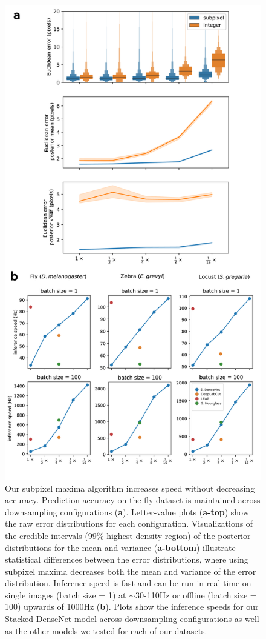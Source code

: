 \documentclass[11pt,a4paper,oneside]{book}
\begin{document}
\begin{appendices}
\begin{figure}[!htb]
    \centering
    \includegraphics[width=0.60\linewidth]{Graving_IMPRS_Thesis/figures/downsample_inference_speed.pdf}
    \caption{Our subpixel maxima algorithm increases speed without decreasing accuracy. Prediction accuracy on the fly dataset is maintained across downsampling configurations (\textbf{a}). Letter-value plots (\textbf{a-top}) show the raw error distributions for each configuration. Visualizations of the credible intervals (99\% highest-density region) of the posterior distributions for the mean and variance (\textbf{a-bottom}) illustrate statistical differences between the error distributions, where using subpixel maxima decreases both the mean and variance of the error distribution. Inference speed is fast and can be run in real-time on single images (batch size = 1) at $\sim$30-110Hz or offline (batch size = 100) upwards of 1000Hz (\textbf{b}). Plots show the inference speeds for our Stacked DenseNet model across downsampling configurations as well as the other models we tested for each of our datasets. }
    \label{fig:downsample_inference_speed}
    
    
    \end{figure}
    
    \begin{figure}[!htb]
    

\end{figure}
\end{appendices}
\end{document}
